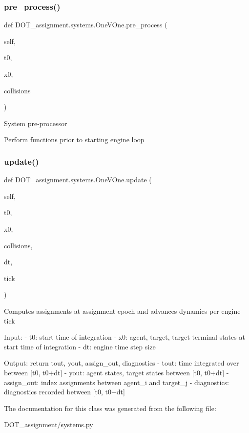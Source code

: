 \subsubsection{\texorpdfstring{pre\_process()}{pre\_process()}}
{\footnotesize\ttfamily def D\+O\+T\+\_\+assignment.\+systems.\+One\+V\+One.\+pre\+\_\+process (\begin{DoxyParamCaption}\item[{}]{self,  }\item[{}]{t0,  }\item[{}]{x0,  }\item[{}]{collisions }\end{DoxyParamCaption})}

\begin{DoxyVerb}System pre-processor

Perform functions prior to starting engine loop
\end{DoxyVerb}
 \mbox{\label{class_d_o_t__assignment_1_1systems_1_1_one_v_one_a8a5d76d462e6208f560f3398578ea19c}} 
\subsubsection{\texorpdfstring{update()}{update()}}
{\footnotesize\ttfamily def D\+O\+T\+\_\+assignment.\+systems.\+One\+V\+One.\+update (\begin{DoxyParamCaption}\item[{}]{self,  }\item[{}]{t0,  }\item[{}]{x0,  }\item[{}]{collisions,  }\item[{}]{dt,  }\item[{}]{tick }\end{DoxyParamCaption})}

\begin{DoxyVerb}Computes assignments at assignment epoch and advances dynamics per engine tick

Input:
- t0:           start time of integration
- x0:           agent, target, target terminal states at start time of integration
- dt:           engine time step size

Output:
return tout, yout, assign_out, diagnostics
- tout:         time integrated over between [t0, t0+dt]
- yout:         agent states, target states between [t0, t0+dt]
- assign_out:   index assignments between agent_i and target_j
- diagnostics:  diagnostics recorded between [t0, t0+dt]\end{DoxyVerb}
 

The documentation for this class was generated from the following file\+:\begin{DoxyCompactItemize}
\item 
D\+O\+T\+\_\+assignment/systems.\+py\end{DoxyCompactItemize}
